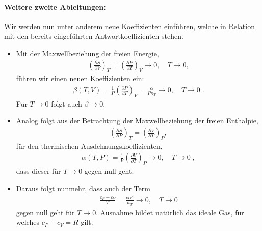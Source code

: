 \paragraph*{Weitere zweite Ableitungen:} 
Wir werden nun unter anderem neue Koeffizienten einführen, welche in Relation mit den bereits eingeführten Antwortkoeffizienten stehen.
\begin{itemize}
    \item {} Mit der Maxwellbeziehung der freien Energie,
    \begin{align*}
        \left(\frac{\partial S}{\partial V}\right)_T=\left(\frac{\partial P}{\partial T}\right)_V \rightarrow 0, \quad T\rightarrow 0,
    \end{align*}
    führen wir einen neuen Koeffizienten ein:
    \begin{align*}
        \boxed{\beta(T,V)=\frac{1}{P}\left(\frac{\partial P}{\partial T}\right)_V=\frac{\alpha}{P\kappa_T}\rightarrow 0, \quad T\rightarrow 0}\;.
    \end{align*}
    Für $T\rightarrow 0$ folgt auch $\beta\rightarrow 0$.
    \item {} Analog folgt aus der Betrachtung der Maxwellbeziehung der freien Enthalpie,
    \begin{align*}
        \left(\frac{\partial S}{\partial P}\right)_T=\left(\frac{\partial V}{\partial T}\right)_P,
    \end{align*}
    für den thermischen Ausdehnungskoeffizienten,
    \begin{align*}
        \boxed{\alpha(T,P)=\frac{1}{V}\left(\frac{\partial V}{\partial T}\right)_P\rightarrow 0, \quad T\rightarrow 0}\;,
    \end{align*}
    dass dieser für $T\rightarrow 0$ gegen null geht.
    \item Daraus folgt nunmehr, dass auch der Term
    \begin{align*}
        \boxed{\frac{c_P-c_V}{T}=\frac{v\alpha^2}{\kappa_T}\rightarrow 0, \quad T\rightarrow 0}
    \end{align*}
    gegen null geht für $T\rightarrow 0$. Ausnahme bildet natürlich das ideale Gas, für welches $c_P-c_V=R$ gilt.
\end{itemize}
